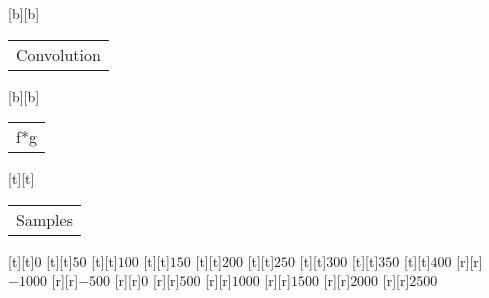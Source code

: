%
%
[b][b]{\fontsize{8}{12}\selectfont \setlength{\tabcolsep}{0pt}\begin{tabular}{c}Convolution\end{tabular}}%
[b][b]{\fontsize{8}{12}\selectfont \setlength{\tabcolsep}{0pt}\begin{tabular}{c}f*g\end{tabular}}%
[t][t]{\fontsize{8}{12}\selectfont \setlength{\tabcolsep}{0pt}\begin{tabular}{c}Samples\end{tabular}}%
%
\fontsize{6}{8}%
\selectfont%
%
[t][t]{$0$}%
[t][t]{$50$}%
[t][t]{$100$}%
[t][t]{$150$}%
[t][t]{$200$}%
[t][t]{$250$}%
[t][t]{$300$}%
[t][t]{$350$}%
[t][t]{$400$}%
%
[r][r]{$-1000$}%
[r][r]{$-500$}%
[r][r]{$0$}%
[r][r]{$500$}%
[r][r]{$1000$}%
[r][r]{$1500$}%
[r][r]{$2000$}%
[r][r]{$2500$}%
%
%
